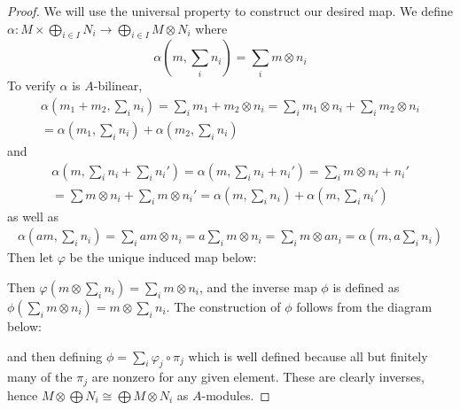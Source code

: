 \documentclass{article}
\begin{document}
\begin{proof}
    We will use the universal property to construct our desired map. We define $\alpha:M\times \bigoplus_{i\in I} N_i\to \bigoplus_{i\in I} M\otimes N_i$ where
    \[
    \alpha(m,\sum_i n_i)=\sum_i m\otimes n_i
    \]
    To verify $\alpha$ is $A$-bilinear,
    \begin{align*}
        \alpha(m_1+m_2,\sum_i n_i)=\sum_i m_1+m_2\otimes n_i=\sum_i m_1\otimes n_i+\sum_i m_2\otimes n_i\\
        =\alpha(m_1,\sum_i n_i)+\alpha(m_2,\sum_i n_i)
    \end{align*}
    and
    \begin{align*}
        \alpha(m,\sum_i n_i+\sum_i n_i')=\alpha(m,\sum_i n_i+n_i')=\sum_i m\otimes n_i+n_i'\\
        =\sum m\otimes n_i+\sum_i m\otimes n_i'=\alpha(m,\sum_i n_i)+\alpha(m,\sum_i n_i')
    \end{align*}
    as well as
    \begin{align*}
        \alpha(am,\sum_i n_i)=\sum_i am\otimes n_i=a\sum_i m\otimes n_i=\sum_i m\otimes an_i=\alpha(m,a\sum_i n_i)
    \end{align*}
Then let $\varphi$ be the unique induced map below:
\begin{center}
    \end{center}
    Then $\varphi(m\otimes \sum_i n_i)=\sum_i m\otimes n_i$, and the inverse map $\phi$ is defined as $\phi(\sum_i m\otimes n_i)=m\otimes \sum_i n_i$. The construction of $\phi$ follows from the diagram below:
    \begin{center}
    \end{center}
    and then defining $\phi=\sum_i \varphi_j\circ \pi_j$ which is well defined because all but finitely many of the $\pi_j$ are nonzero for any given element. These are clearly inverses, hence $M\otimes \bigoplus N_i\cong \bigoplus M\otimes N_i$ as $A$-modules.
\end{proof}
\end{document}
